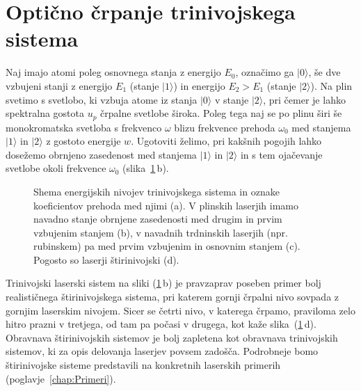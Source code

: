 \section{Optično črpanje trinivojskega sistema}
Naj imajo atomi poleg osnovnega stanja z energijo $E_0$, označimo ga $|0\rangle$,
še dve vzbujeni stanji z energijo $E_1$ (stanje $|1\rangle$) in energijo $E_2>E_1$
(stanje $|2\rangle$). Na plin svetimo s svetlobo, ki
vzbuja atome iz stanja $|0\rangle$ v stanje $|2\rangle$, pri čemer
je lahko spektralna gostota $u_{p}$ črpalne svetlobe široka. Poleg
tega naj se po plinu širi še monokromatska svetloba s frekvenco $\omega$
blizu frekvence prehoda $\omega_{0}$ med stanjema $|1\rangle$ in
$|2\rangle$ z gostoto energije $w$. Ugotoviti želimo, pri kakšnih
pogojih lahko dosežemo obrnjeno zasedenost med stanjema $|1\rangle$ in $|2\rangle$
in s tem ojačevanje svetlobe okoli frekvence $\omega_{0}$ (slika~\ref{fig:3nivojski}\,b).
\begin{figure}[h]
\centering
\def\svgwidth{140truemm} 

\caption{Shema energijskih nivojev trinivojskega sistema in oznake koeficientov
prehoda med njimi (a). 
V plinskih laserjih imamo navadno stanje obrnjene zasedenosti med drugim in prvim
vzbujenim stanjem (b), v navadnih trdninskih laserjih (npr. rubinskem) pa med 
prvim vzbujenim in osnovnim stanjem (c). Pogosto so laserji štirinivojski (d).}
\label{fig:3nivojski}
\end{figure}
\begin{remark}
Trinivojski laserski sistem na sliki (\ref{fig:3nivojski}\,b) je pravzaprav 
poseben primer bolj realističnega štirinivojskega sistema, 
pri katerem gornji črpalni nivo sovpada z gornjim laserskim nivojem. Sicer se četrti nivo, 
v katerega črpamo, praviloma zelo hitro prazni v tretjega, od tam pa počasi v drugega, kot kaže slika~(\ref{fig:3nivojski}\,d).
Obravnava štirinivojskih sistemov je bolj zapletena kot obravnava trinivojskih sistemov, 
ki za opis delovanja laserjev povsem zadošča. Podrobneje bomo štirinivojske sisteme predstavili na konkretnih laserskih primerih (poglavje~\ref{chap:Primeri}).
\end{remark}

